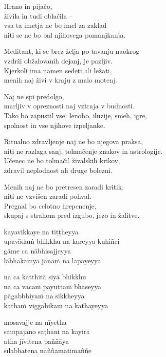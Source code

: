 \clearpage

Hrano in pijačo,\\
živila in tudi oblačila --\\
vsa ta imetja ne bo imel za zaklad\\
niti se ne bo bal njihovega pomanjkanja.

Meditant, ki se brez želja po tavanju naokrog\\
vzdrži obžalovanih dejanj, je pazljiv.\\
Kjerkoli ima namen sedeti ali ležati,\\
menih naj živi v kraju z malo motenj.

Naj ne spi predolgo,\\
marljiv v opreznosti naj vztraja v budnosti.\\
Tako bo zapustil vse: lenobo, iluzije, smeh, igre,\\
spolnost in vse njihove izpeljanke.

Ritualno zdravljenje naj ne bo njegova praksa,\\
niti ne razlaga sanj, tolmačenje znakov in astrologije.\\
Učenec ne bo tolmačil živalskih krikov,\\
zdravil neplodnost ali druge bolezni.

Menih naj ne bo pretresen zaradi kritik,\\
niti ne vzvišen zaradi pohval.\\
Pregnal bo celotno hrepenenje,\\
skupaj s strahom pred izgubo, jezo in žalitve.


\clearpage

kayavikkaye na tiṭṭheyya\\
upavādaṁ bhikkhu na kareyya kuhiñci\\
gāme ca nābhisajjeyya\\
lābhakamyā janaṁ na lapayeyya

na ca katthitā siyā bhikkhu\\
na ca vācaṁ payuttaṁ bhāseyya\\
pāgabbhiyaṁ na sikkheyya\\
kathaṁ viggāhikaṁ na kathayeyya

mosavajje na nīyetha\\
sampajāno saṭhāni na kayirā\\
atha jīvitena paññāya\\
sīlabbatena nāññamatimaññe

